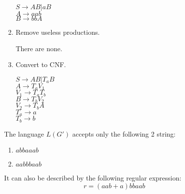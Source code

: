 \documentclass[12pt]{article}
\begin{document}
\begin{spacing}{1.5}
\begin{enumerate}
\begin{enumerate}
\begin{enumerate}
                                          $S \rightarrow AB | aB$ \\
                                          $A \rightarrow aab$ \\
                                          $B \rightarrow bbA$

                                    \item[Step 3:] Remove useless productions.

                                          There are none.

                                    \item[Step 4 and 5:] Convert to CNF.

                                          $S \rightarrow AB | T_aB$ \\
                                          $A \rightarrow T_aV_1$ \\
                                          $V_1 \rightarrow T_aT_b$ \\
                                          $B \rightarrow T_bV_2$ \\
                                          $V_2 \rightarrow T_bA$ \\
                                          $T_a \rightarrow a$ \\
                                          $T_b \rightarrow b$
                              \end{enumerate}
                              \newpage
                              The language $L(G')$ accepts only the following 2 string:
                              \begin{enumerate}
                                    \item $abbaaab$
                                    \item $aabbbaab$
                              \end{enumerate}
                              It can also be described by the following regular expression:
                              $$r=(aab+a)bbaab$$

                  \end{enumerate}

      \end{enumerate}

\end{spacing}
\end{document}
